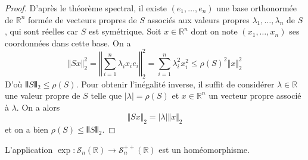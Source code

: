   \begin{proof}
    D'après le théorème spectral, il existe $(e_1, \dots, e_n)$ une base orthonormée de $\mathbb{R}^n$ formée de vecteurs propres de $S$ associés aux valeurs propres $\lambda_1, \dots, \lambda_n$ de $S$, qui sont réelles car $S$ est symétrique. Soit $x \in \mathbb{R}^n$ dont on note $(x_1, \dots, x_n)$ ses coordonnées dans cette base. On a
    \[ \Vert Sx \Vert_2^2 = \left \Vert \sum_{i=1}^{n} \lambda_i x_i e_i \right \Vert_2^2 = \sum_{i=1}^n \lambda_i^2 x_i^2 \leq \rho(S)^2 \Vert x \Vert_2^2 \]
    D'où $\VERT S \VERT_2 \leq \rho(S)$. Pour obtenir l'inégalité inverse, il suffit de considérer $\lambda \in \mathbb{R}$ une valeur propre de $S$ telle que $|\lambda| = \rho(S)$ et $x \in \mathbb{R}^n$ un vecteur propre associé à $\lambda$. On a alors
    \[ \Vert Sx \Vert_2 = |\lambda| \Vert x \Vert_2 \]
    et on a bien $\rho(S) \leq \VERT S \VERT_2$.
  \end{proof}

  \begin{theorem}
    L'application $\exp : \mathcal{S}_n(\mathbb{R}) \rightarrow \mathcal{S}^{++}_n(\mathbb{R})$ est un homéomorphisme.
  \end{theorem}

